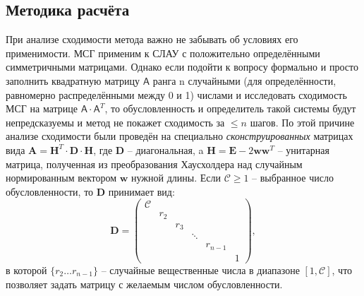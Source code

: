 \subsection{Методика расчёта}
При анализе сходимости метода важно не забывать об условиях его применимости. МСГ применим к СЛАУ с положительно определёнными симметричными матрицами. Однако если подойти к вопросу формально и просто заполнить квадратную матрицу $\mathsf{A}$ ранга n случайными (для определённости, равномерно распределёнными между 0 и 1) числами и исследовать сходимость МСГ на матрице $\mathsf{A} \cdot \mathsf{A}^T$, то обусловленность и определитель такой системы будут непредсказуемы и метод не покажет сходимость за $\le n$ шагов. По этой причине анализе сходимости были проведён на специально {\it сконструированных} матрицах вида $\mathbf{A = H}^T\cdot \mathbf{D \cdot H}$, где $\mathbf{D}$ -- диагональная, a $\mathbf{H = E} - 2\mathbf{ww}^T$ -- унитарная матрица, полученная из преобразования Хаусхолдера над случайным нормированным вектором $\mathbf{w}$ нужной длины. Если $\mathcal{C}\ge1$ -- выбранное число обусловленности, то $\mathbf{D}$ принимает вид:
$$\mathbf{D} =
\begin{pmatrix}
    \mathcal{C} &   &   &      &       &\\
                &r_2&   &      &       &\\
                &   &r_3&      &       &\\
                &   &   &\ddots&       &\\
                &   &   &      &r_{n-1}&\\
                &   &   &      &       &1
\end{pmatrix},$$
в которой $\{r_2 \ldots r_{n-1}\}$ -- случайные вещественные числа в диапазоне $[1, \mathcal{C}]$, что позволяет задать матрицу с желаемым числом обусловленности.


